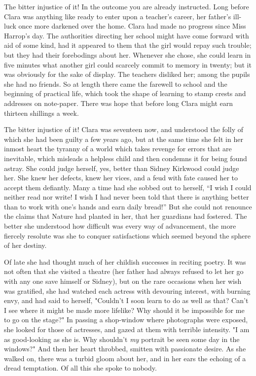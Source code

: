 The bitter injustice of it! In the outcome you are already instructed.
Long before Clara was anything like ready to enter upon a teacher's
career, her father's ill-luck once {\protect\hypertarget{197}{}{}}more
darkened over the home. Clara had made no progress since Miss Harrop's
day. The authorities directing her school might have come forward with
aid of some kind, had it appeared to them that the girl would repay such
trouble; but they had their forebodings about her. Whenever she chose,
she could learn in five minutes what another girl could scarcely commit
to memory in twenty; but it was obviously for the sake of display. The
teachers disliked her; among the pupils she had no friends. So at length
there came the farewell to school and the beginning of practical life,
which took the shape of learning to stamp crests and addresses on
note-paper. There was hope that before long Clara might earn thirteen
shillings a week.

The bitter injustice of it! Clara was seventeen now, and understood the
folly of which she had been guilty a few years ago, but at the same time
she felt in her inmost heart the tyranny of a world which takes revenge
for errors that are inevitable, which misleads a
{\protect\hypertarget{198}{}{}}helpless child and then condemns it for
being found astray. She could judge herself, yes, better than Sidney
Kirkwood could judge her. She knew her defects, knew her vices, and a
feud with fate caused her to accept them defiantly. Many a time had she
sobbed out to herself, ``I wish I could neither read nor write! I wish I
had never been told that there is anything better than to work with
one's hands and earn daily bread!'' But she could not renounce the
claims that Nature had planted in her, that her guardians had fostered.
The better she understood how difficult was every way of advancement,
the more fiercely resolute was she to conquer satisfactions which seemed
beyond the sphere of her destiny.

Of late she had thought much of her childish successes in reciting
poetry. It was not often that she visited a theatre (her father had
always refused to let her go with any one save himself or Sidney), but
on the rare occasions when her wish was gratified, she had watched each
actress with devouring interest, with burning envy, and had said to
herself, "Couldn't {\protect\hypertarget{199}{}{}}I soon learn to do as
well as that? Can't I see where it might be made more lifelike? Why
should it be impossible for me to go on the stage?" In passing a
shop-window where photographs were exposed, she looked for those of
actresses, and gazed at them with terrible intensity. "I am as
good-looking as she is. Why shouldn't \emph{my} portrait be seen some
day in the windows?" And then her heart throbbed, smitten with
passionate desire. As she walked on, there was a turbid gloom about her,
and in her ears the echoing of a dread temptation. Of all this she spoke
to nobody.

